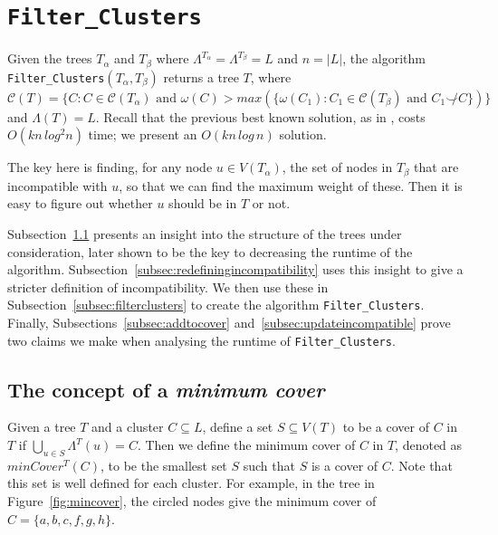 \documentclass{article}
\newcommand{\compatible}{\smile}
\newcommand{\leafset}{\Lambda}
\newcommand{\weight}{\omega}
\newcommand{\TA}{T_\alpha}
\newcommand{\TB}{T_\beta}
\begin{document}
    \section{\texttt{Filter\_Clusters}}
    \label{sec:filterclusters}

    Given the trees $\TA$ and $\TB$ where $\leafset^{\TA} = \leafset^{\TB} = L$ and $n = |L|$, the algorithm \texttt{Filter\_Clusters}$(\TA, \TB)$ returns a tree $T$, where $\mathcal{C}(T) = \{C : C \in \mathcal{C}(\TA) \text{ and } \weight(C) > max(\{\weight(C_1) : C_1 \in \mathcal{C}(\TB) \text{ and } C_1 \not\compatible C\})\}$ and $\leafset(T) = L$. Recall that the previous best known solution, as in \cite{jansson2018algorithms}, costs $O(kn\,log^2n)$ time; we present an $O(kn\,log\,n)$ solution.

    The key here is finding, for any node $u \in V(\TA)$, the set of nodes in $\TB$ that are incompatible with $u$, so that we can find the maximum weight of these. Then it is easy to figure out whether $u$ should be in $T$ or not.

    Subsection~\ref{subsec:mincover} presents an insight into the structure of the trees under consideration, later shown to be the key to decreasing the runtime of the algorithm. Subsection~\ref{subsec:redefiningincompatibility} uses this insight to give a stricter definition of incompatibility. We then use these in Subsection~\ref{subsec:filterclusters} to create the algorithm \texttt{Filter\_Clusters}. Finally, Subsections~\ref{subsec:addtocover} and~\ref{subsec:updateincompatible} prove two claims we make when analysing the runtime of \texttt{Filter\_Clusters}.

    \subsection{The concept of a \textit{minimum cover}}
    \label{subsec:mincover}

    Given a tree $T$ and a cluster $C \subseteq L$, define a set $S \subseteq V(T)$ to be a cover of $C$ in $T$ if $\bigcup_{u \in S} \leafset^{T}(u) = C$. Then we define the minimum cover of $C$ in $T$, denoted as $minCover^{T}(C)$, to be the smallest set $S$ such that $S$ is a cover of $C$. Note that this set is well defined for each cluster. For example, in the tree in Figure~\ref{fig:mincover}, the circled nodes give the minimum cover of $C = \{a, b, c, f, g, h\}$.
\end{document}
